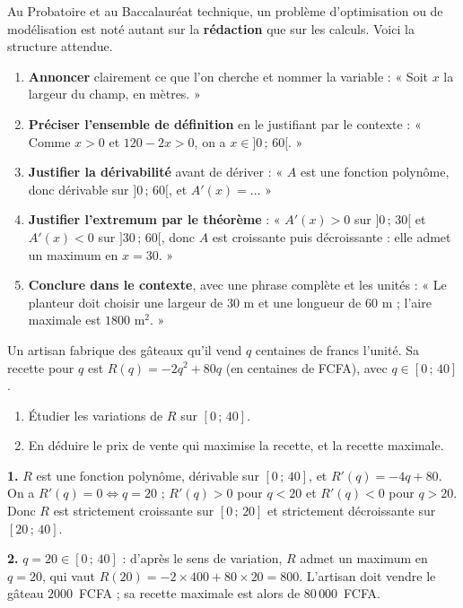 \documentclass[11pt]{article}
\newcounter{popsec}
\newcounter{popsub}
\newcommand{\courssub}[1]{%
  \stepcounter{popsub}%
  \par\vspace{9pt}\noindent{\popxbold\fontsize{11.5}{13}\selectfont\color{popink}{\color{poporange}\thepopsec.\thepopsub}\hspace{6pt}#1}\par\nopagebreak\vspace{4pt}
}
\begin{document}
\courssub{Rédaction type examen}

Au Probatoire et au Baccalauréat technique, un problème d'optimisation ou de modélisation est noté autant sur la \textbf{rédaction} que sur les calculs. Voici la structure attendue.

\begin{methode}
\begin{enumerate}
\item \textbf{Annoncer} clairement ce que l'on cherche et nommer la variable : « Soit $x$ la largeur du champ, en mètres. »
\item \textbf{Préciser l'ensemble de définition} en le justifiant par le contexte : « Comme $x > 0$ et $120 - 2x > 0$, on a $x \in ]0\,;\,60[$. »
\item \textbf{Justifier la dérivabilité} avant de dériver : « $A$ est une fonction polynôme, donc dérivable sur $]0\,;\,60[$, et $A'(x) = \ldots$ »
\item \textbf{Justifier l'extremum par le théorème} : « $A'(x) > 0$ sur $]0\,;\,30[$ et $A'(x) < 0$ sur $]30\,;\,60[$, donc $A$ est croissante puis décroissante : elle admet un maximum en $x = 30$. »
\item \textbf{Conclure dans le contexte}, avec une phrase complète et les unités : « Le planteur doit choisir une largeur de $30$ m et une longueur de $60$ m ; l'aire maximale est $1800$ m$^{2}$. »
\end{enumerate}
\end{methode}

\begin{exercice}
Un artisan fabrique des gâteaux qu'il vend $q$ centaines de francs l'unité. Sa recette pour $q$ est $R(q) = -2q^{2} + 80q$ (en centaines de FCFA), avec $q \in [0\,;\,40]$.
\begin{enumerate}
\item Étudier les variations de $R$ sur $[0\,;\,40]$.
\item En déduire le prix de vente qui maximise la recette, et la recette maximale.
\end{enumerate}
\end{exercice}

\begin{corrige}[Exercice]
\textbf{1.} $R$ est une fonction polynôme, dérivable sur $[0\,;\,40]$, et $R'(q) = -4q + 80$. On a $R'(q) = 0 \iff q = 20$ ; $R'(q) > 0$ pour $q < 20$ et $R'(q) < 0$ pour $q > 20$. Donc $R$ est strictement croissante sur $[0\,;\,20]$ et strictement décroissante sur $[20\,;\,40]$.

\textbf{2.} $q = 20 \in [0\,;\,40]$ : d'après le sens de variation, $R$ admet un maximum en $q = 20$, qui vaut $R(20) = -2 \times 400 + 80 \times 20 = 800$. L'artisan doit vendre le gâteau $2000$~FCFA ; sa recette maximale est alors de $80\,000$~FCFA.
\end{corrige}
\end{document}
